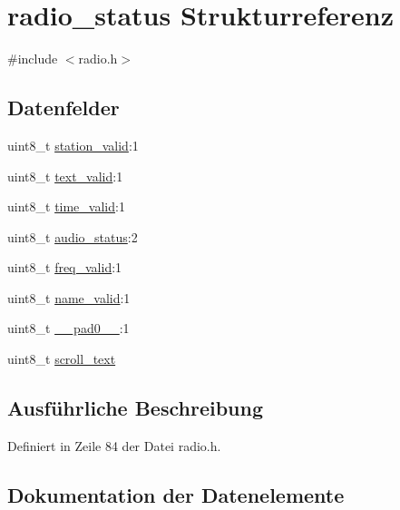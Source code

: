 \hypertarget{structradio__status}{}\section{radio\+\_\+status Strukturreferenz}
\label{structradio__status}


{\ttfamily \#include $<$radio.\+h$>$}

\subsection*{Datenfelder}
\begin{DoxyCompactItemize}
\item 
uint8\+\_\+t \hyperlink{structradio__status_ad84d780e2e45afd62830f27f2d4dbd9a}{station\+\_\+valid}\+:1
\item 
uint8\+\_\+t \hyperlink{structradio__status_a6a0d33cd9094edee0dad3deb6b386914}{text\+\_\+valid}\+:1
\item 
uint8\+\_\+t \hyperlink{structradio__status_a11ae5e5b507c175049a332002aa85849}{time\+\_\+valid}\+:1
\item 
uint8\+\_\+t \hyperlink{structradio__status_afd0f6d5999f07ea569f9492eb4ceb21a}{audio\+\_\+status}\+:2
\item 
uint8\+\_\+t \hyperlink{structradio__status_a3e502e1dcdc44fc044b4f4b43f35a19a}{freq\+\_\+valid}\+:1
\item 
uint8\+\_\+t \hyperlink{structradio__status_a88955dc0fd5d9169c68603ba777b643f}{name\+\_\+valid}\+:1
\item 
uint8\+\_\+t \hyperlink{structradio__status_a8b4eebe79ded0459acec2f4950102ba3}{\+\_\+\+\_\+pad0\+\_\+\+\_\+}\+:1
\item 
uint8\+\_\+t \hyperlink{structradio__status_a16198f5b3b66ddcf01c81f6177af500f}{scroll\+\_\+text}
\end{DoxyCompactItemize}


\subsection{Ausführliche Beschreibung}


Definiert in Zeile 84 der Datei radio.\+h.



\subsection{Dokumentation der Datenelemente}
\hypertarget{structradio__status_a8b4eebe79ded0459acec2f4950102ba3}{}
